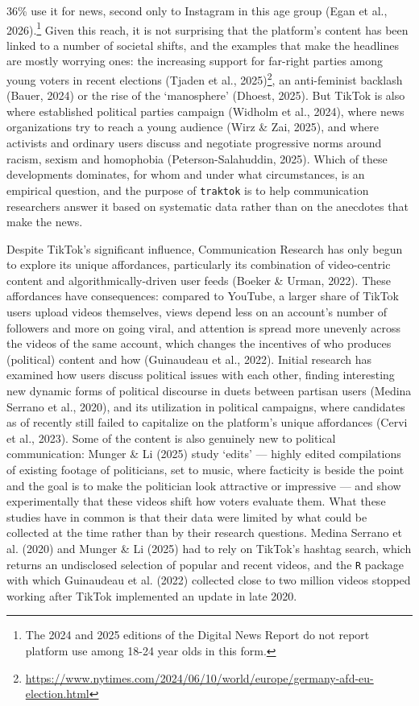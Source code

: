 \documentclass[
  nobib]{ccr}
\begin{document}
36\% use it for news, second only to Instagram in this age group (Egan
et al., 2026).\footnote{The 2024 and 2025 editions of the Digital News
  Report do not report platform use among 18-24 year olds in this form.}
Given this reach, it is not surprising that the platform's content has
been linked to a number of societal shifts, and the examples that make
the headlines are mostly worrying ones: the increasing support for
far-right parties among young voters in recent elections (Tjaden et al.,
2025)\footnote{\href{https://web.archive.org/web/20241003023927/https://www.nytimes.com/2024/06/10/world/europe/germany-afd-eu-election.html}{https://www.nytimes.com/2024/06/10/world/europe/germany-afd-eu-election.html}},
an anti-feminist backlash (Bauer, 2024) or the rise of the `manosphere'
(Dhoest, 2025). But TikTok is also where established political parties
campaign (Widholm et al., 2024), where news organizations try to reach a
young audience (Wirz \& Zai, 2025), and where activists and ordinary
users discuss and negotiate progressive norms around racism, sexism and
homophobia (Peterson-Salahuddin, 2025). Which of these developments
dominates, for whom and under what circumstances, is an empirical
question, and the purpose of \texttt{traktok} is to help communication
researchers answer it based on systematic data rather than on the
anecdotes that make the news.

Despite TikTok's significant influence, Communication Research has only
begun to explore its unique affordances, particularly its combination of
video-centric content and algorithmically-driven user feeds (Boeker \&
Urman, 2022). These affordances have consequences: compared to YouTube,
a larger share of TikTok users upload videos themselves, views depend
less on an account's number of followers and more on going viral, and
attention is spread more unevenly across the videos of the same account,
which changes the incentives of who produces (political) content and how
(Guinaudeau et al., 2022). Initial research has examined how users
discuss political issues with each other, finding interesting new
dynamic forms of political discourse in duets between partisan users
(Medina Serrano et al., 2020), and its utilization in political
campaigns, where candidates as of recently still failed to capitalize on
the platform's unique affordances (Cervi et al., 2023). Some of the
content is also genuinely new to political communication: Munger \& Li
(2025) study `edits' --- highly edited compilations of existing footage
of politicians, set to music, where facticity is beside the point and
the goal is to make the politician look attractive or impressive --- and
show experimentally that these videos shift how voters evaluate them.
What these studies have in common is that their data were limited by
what could be collected at the time rather than by their research
questions. Medina Serrano et al. (2020) and Munger \& Li (2025) had to
rely on TikTok's hashtag search, which returns an undisclosed selection
of popular and recent videos, and the \texttt{R} package with which
Guinaudeau et al. (2022) collected close to two million videos stopped
working after TikTok implemented an update in late 2020.
\end{document}

